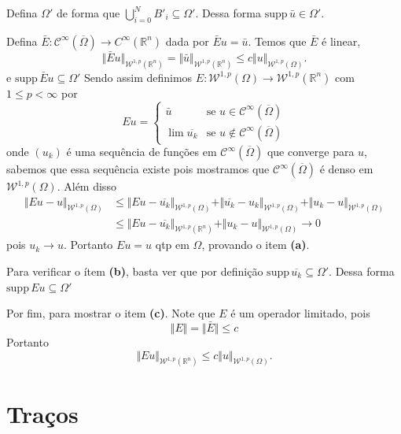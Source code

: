 \documentclass[a4paper, 11pt]{book}
\theoremstyle{definition}
\newcommand{\bR}{\mathbb{R}}
\newcommand{\cC}{\mathcal{C}}
\newcommand{\cW}{\mathcal{W}}
\newcommand{\supp}{\mathrm{supp}\,}
\begin{document}
\begin{prf}
    Defina $\Omega'$ de forma que $\bigcup_{i=0}^N B'_i \subseteq \Omega'$.
    Dessa forma $\supp \bar u \in \Omega'$.
    
    Defina $\bar E: \cC^\infty(\overline\Omega) \to C^\infty(\bR^n)$ dada por $\bar E u = \bar u$.
    Temos que $\bar E$ é linear,
    \[
        \Vert \bar E u \Vert_{\cW^{1,p}(\bR^n)} = \Vert \bar u \Vert_{\cW^{1,p}(\bR^n)} \leqslant c \Vert u \Vert_{\cW^{1,p}(\Omega)}.
    \]
    e $\supp \bar E u \subseteq \Omega'$
    Sendo assim definimos $E : \cW^{1,p}(\Omega) \to \cW^{1,p}(\bR^n)$ com $1 \leqslant p < \infty$ por
    \[
        E u = 
        \left\{ 
            \begin{array}{ll}
                \bar u & \text{se } u \in \cC^\infty(\overline \Omega)\\
                \lim \overline {u_k} &\text{se } u \not\in \cC^\infty(\overline\Omega)
            \end{array}
        \right.
    \]
    onde $(u_k)$ é uma sequência de funções em $\cC^\infty(\overline\Omega)$ que converge para $u$, sabemos que essa sequência existe pois mostramos que $\cC^\infty(\overline\Omega)$ é denso em $\cW^{1,p}(\Omega)$.
    Além disso
    \[
        \begin{aligned}
            \Vert Eu - u \Vert_{\cW^{1,p}(\Omega)} &\leqslant \Vert Eu - \overline{u_k} \Vert_{\cW^{1,p}(\Omega)} + \Vert \overline{u_k} - u_k \Vert_{\cW^{1,p}(\Omega)} + \Vert u_k - u\Vert_{\cW^{1,p}(\Omega)}\\
            &\leqslant \Vert Eu - \overline{u_k} \Vert_{\cW^{1,p}(\bR^n)} + \Vert u_k - u \Vert_{\cW^{1,p}(\Omega)} \to 0
        \end{aligned}
    \]
    pois $u_k \to u$.
    Portanto $Eu = u$ qtp em $\Omega$, provando o item \textbf{(a)}.

    Para verificar o ítem \textbf{(b)}, basta ver que por definição $\supp \overline{u_k} \subseteq \Omega'$.
    Dessa forma $\supp Eu \subseteq \Omega'$

    Por fim, para mostrar o item \textbf{(c)}.
    Note que $E$ é um operador limitado, pois
    \[
        \Vert E \Vert = \Vert \bar E \Vert \leqslant c
    \]
    Portanto
    \[
        \Vert Eu \Vert_{\cW^{1,p}(\bR^n)} \leqslant c \Vert u \Vert_{\cW^{1,p}(\Omega)}.
    \]
\end{prf}

\section{Traços}
\end{document}
